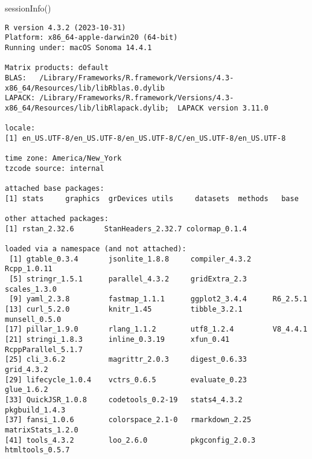 \documentclass[
  letterpaper,
  DIV=11,
  numbers=noendperiod]{scrartcl}
\newenvironment{Shaded}{\begin{snugshade}}{\end{snugshade}}
\newcommand{\FunctionTok}[1]{\textcolor[rgb]{0.28,0.35,0.67}{#1}}
\newcommand{\NormalTok}[1]{\textcolor[rgb]{0.00,0.23,0.31}{#1}}
\begin{document}
\begin{Shaded}
\begin{Highlighting}[]
\FunctionTok{sessionInfo}\NormalTok{()}
\end{Highlighting}
\end{Shaded}

\begin{verbatim}
R version 4.3.2 (2023-10-31)
Platform: x86_64-apple-darwin20 (64-bit)
Running under: macOS Sonoma 14.4.1

Matrix products: default
BLAS:   /Library/Frameworks/R.framework/Versions/4.3-x86_64/Resources/lib/libRblas.0.dylib 
LAPACK: /Library/Frameworks/R.framework/Versions/4.3-x86_64/Resources/lib/libRlapack.dylib;  LAPACK version 3.11.0

locale:
[1] en_US.UTF-8/en_US.UTF-8/en_US.UTF-8/C/en_US.UTF-8/en_US.UTF-8

time zone: America/New_York
tzcode source: internal

attached base packages:
[1] stats     graphics  grDevices utils     datasets  methods   base     

other attached packages:
[1] rstan_2.32.6       StanHeaders_2.32.7 colormap_0.1.4    

loaded via a namespace (and not attached):
 [1] gtable_0.3.4       jsonlite_1.8.8     compiler_4.3.2     Rcpp_1.0.11       
 [5] stringr_1.5.1      parallel_4.3.2     gridExtra_2.3      scales_1.3.0      
 [9] yaml_2.3.8         fastmap_1.1.1      ggplot2_3.4.4      R6_2.5.1          
[13] curl_5.2.0         knitr_1.45         tibble_3.2.1       munsell_0.5.0     
[17] pillar_1.9.0       rlang_1.1.2        utf8_1.2.4         V8_4.4.1          
[21] stringi_1.8.3      inline_0.3.19      xfun_0.41          RcppParallel_5.1.7
[25] cli_3.6.2          magrittr_2.0.3     digest_0.6.33      grid_4.3.2        
[29] lifecycle_1.0.4    vctrs_0.6.5        evaluate_0.23      glue_1.6.2        
[33] QuickJSR_1.0.8     codetools_0.2-19   stats4_4.3.2       pkgbuild_1.4.3    
[37] fansi_1.0.6        colorspace_2.1-0   rmarkdown_2.25     matrixStats_1.2.0 
[41] tools_4.3.2        loo_2.6.0          pkgconfig_2.0.3    htmltools_0.5.7   
\end{verbatim}
\end{document}
